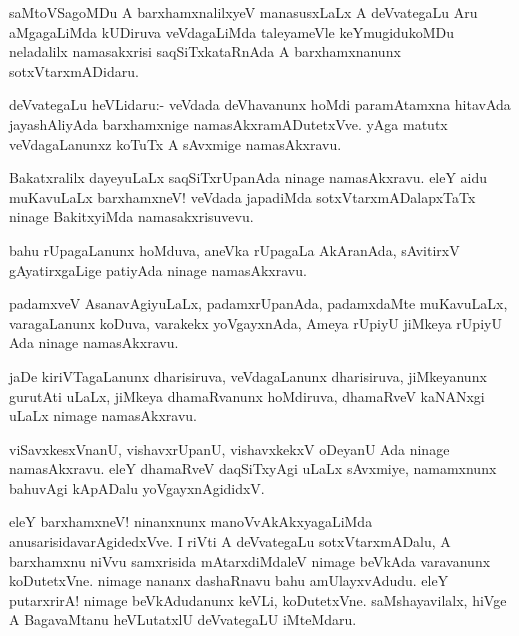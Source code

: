 \documentclass{article}
\begin{document}
\begin{mn}%
saMtoVSagoMDu A barxhamxnalilxyeV manasusxLaLx A deVvategaLu Aru
aMgagaLiMda kUDiruva veVdagaLiMda taleyameVle keYmugidukoMDu
neladalilx namasakxrisi saqSiTxkataRnAda A barxhamxnanunx sotxVtarxmADidaru.
\end{mn}

\begin{mn}
deVvategaLu heVLidaru:- veVdada deVhavanunx hoMdi paramAtamxna
hitavAda jayashAliyAda barxhamxnige namasAkxramADutetxVve. yAga matutx
veVdagaLanunxz koTuTx A sAvxmige namasAkxravu.
\end{mn}

\begin{mn}
Bakatxralilx dayeyuLaLx saqSiTxrUpanAda ninage namasAkxravu. eleY aidu
muKavuLaLx barxhamxneV! veVdada japadiMda sotxVtarxmADalapxTaTx ninage
BakitxyiMda namasakxrisuvevu.
\end{mn}

\begin{mn}
bahu rUpagaLanunx hoMduva, aneVka rUpagaLa AkAranAda, sAvitirxV
gAyatirxgaLige patiyAda ninage namasAkxravu.
\end{mn}

\begin{mn}
padamxveV AsanavAgiyuLaLx, padamxrUpanAda, padamxdaMte muKavuLaLx,
varagaLanunx koDuva, varakekx yoVgayxnAda, Ameya rUpiyU jiMkeya rUpiyU
Ada ninage namasAkxravu.
\end{mn}

\begin{mn}%
jaDe kiriVTagaLanunx dharisiruva, veVdagaLanunx dharisiruva,
jiMkeyanunx gurutAti uLaLx, jiMkeya dhamaRvanunx hoMdiruva, dhamaRveV
kaNANxgi uLaLx nimage namasAkxravu.
\end{mn}

\begin{mn}
viSavxkesxVnanU, vishavxrUpanU, vishavxkekxV oDeyanU Ada ninage
namasAkxravu. eleY dhamaRveV daqSiTxyAgi uLaLx sAvxmiye, namamxnunx
bahuvAgi kApADalu yoVgayxnAgididxV.
\end{mn}

\begin{mn}%
eleY barxhamxneV! ninanxnunx manoVvAkAkxyagaLiMda
anusarisidavarAgidedxVve. I riVti A deVvategaLu sotxVtarxmADalu, A
barxhamxnu niVvu samxrisida mAtarxdiMdaleV nimage beVkAda varavanunx
koDutetxVne. nimage nananx dashaRnavu bahu amUlayxvAdudu. eleY
putarxrirA! nimage beVkAdudanunx keVLi, koDutetxVne. saMshayavilalx,
hiVge A BagavaMtanu heVLutatxlU deVvategaLU iMteMdaru.
\end{mn}
\end{document}
